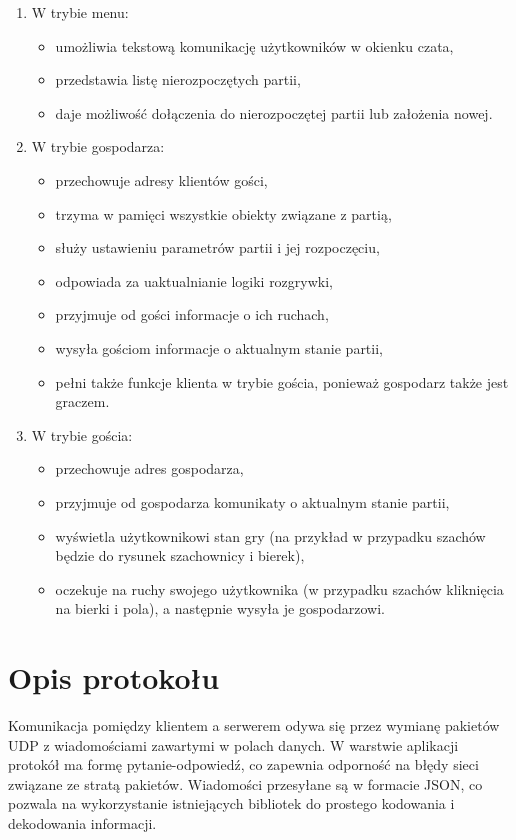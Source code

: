 \documentclass[a4paper, 12pt]{article}
\begin{document}
\begin{enumerate}
 \item W trybie menu:
    \begin{itemize}
      \item umożliwia tekstową komunikację użytkowników w okienku czata,
      \item przedstawia listę nierozpoczętych partii,
      \item daje możliwość dołączenia do nierozpoczętej partii lub założenia nowej.
    \end{itemize}

 \item W trybie gospodarza:
    \begin{itemize}
      \item przechowuje adresy klientów gości,
      \item trzyma w pamięci wszystkie obiekty związane z partią, 
      \item służy ustawieniu parametrów partii i jej rozpoczęciu,
      \item odpowiada za uaktualnianie logiki rozgrywki,
      \item przyjmuje od gości informacje o ich ruchach,
      \item wysyła gościom informacje o aktualnym stanie partii,
      \item pełni także funkcje klienta w trybie gościa, ponieważ gospodarz także jest graczem.
    \end{itemize}

 \item W trybie gościa:
    \begin{itemize}
      \item przechowuje adres gospodarza,
      \item przyjmuje od gospodarza komunikaty o aktualnym stanie partii,
      \item wyświetla użytkownikowi stan gry (na przykład w przypadku szachów będzie do rysunek szachownicy i bierek),
      \item oczekuje na ruchy swojego użytkownika (w przypadku szachów kliknięcia na bierki i pola), a następnie wysyła je gospodarzowi.
    \end{itemize}
\end{enumerate}


\section{Opis protokołu}
Komunikacja pomiędzy klientem a serwerem odywa się przez wymianę pakietów UDP z wiadomościami zawartymi w polach danych. W warstwie aplikacji protokół ma formę pytanie-odpowiedź, co zapewnia odporność na błędy sieci związane ze stratą pakietów. Wiadomości przesyłane są w formacie JSON, co pozwala na wykorzystanie istniejących bibliotek do prostego kodowania i dekodowania informacji.
\end{document}
